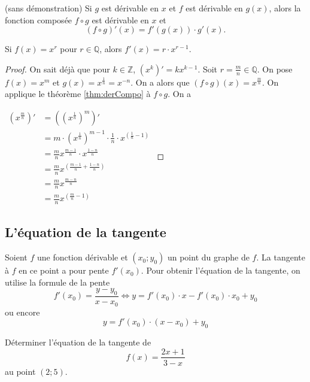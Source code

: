 \documentclass[a4paper,12pt]{article}
\begin{document}
\begin{thm}[label=thm:derCompo]
	(sans démonstration)
	\tcblower
	Si $g$ est dérivable en $x$ et $f$ est dérivable en $g(x)$, alors la fonction composée $f\circ g$ est dérivable en $x$ et
	\[(f\circ g)'(x)=f'(g(x))\cdot g'(x).\]
\end{thm}
\begin{coro}
	\tcblower
	Si $f(x)=x^r$ pour $r\in \mathbb{Q}$, alors $f'(x)=r\cdot x^{r-1}$.
	\medskip
	
	\begin{proof}
		On sait déjà que pour $k\in \mathbb{Z}$, $(x^k)'=kx^{k-1}$. Soit $r=\frac{m}{n}\in \mathbb{Q}$. 
		On pose $f(x)=x^m$ et $g(x)=x^\frac{1}{n}=x^{-n}$. On a alors que $(f\circ g)(x)=x^\frac{m}{n}$. 
		On applique le théorème \ref{thm:derCompo} à $f\circ g$. On a 

$	\begin{aligned}
	\left(x^{\frac{m}{n}}\right)'&=\left(\left(x^{\frac{1}{n}}\right)^m\right)'\\
					      &=m\cdot \left(x^\frac{1}{n}\right)^{m-1}\cdot \frac{1}{n}\cdot x^{\left(\frac{1}{n}-1\right)}\\
					      &=\frac{m}{n}x^\frac{m-1}{n}\cdot x^{\frac{1-n}{n}}\\
					      &=\frac{m}{n}x^{\left(\frac{m-1}{n}+\frac{1-n}{n}\right)}\\
					      &=\frac{m}{n}x^{\frac{m-n}{n}}\\
					      &=\frac{m}{n}x^{\left(\frac{m}{n}-1\right)}
	\end{aligned}$

	\end{proof}
\end{coro}
\subsection{L'équation de la tangente}
\begin{formule}
	\tcblower
Soient $f$ une fonction dérivable et $(x_0;y_0)$ un point du graphe de $f$. La tangente à $f$ en ce point a pour pente $f'(x_0)$. Pour obtenir l'équation de la tangente, on utilise la formule de la pente 
\[
	f'(x_0)=\dfrac{y-y_0}{x-x_0} \iff y=f'(x_0)\cdot x-f'(x_0)\cdot x_0 +y_0 
\]
ou encore
\[y=f'(x_0)\cdot (x-x_0)+y_0\]
\end{formule}
\begin{exemple}
	\tcblower
	Déterminer l'équation de la tangente de 
	\[f(x)=\dfrac{2x+1}{3-x}\]
	au point $(2;5)$. 
	\vspace{4cm}
\end{exemple}
\end{document}

